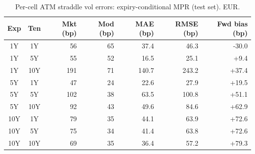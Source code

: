 \begin{table}[H]
\centering
\caption{Per-cell ATM straddle vol errors: expiry-conditional MPR (test set). EUR.}
\label{tab:expiry_mpr_per_cell_test}
\small
\begin{tabular}{@{}ccrrrrr@{}}
\toprule
\textbf{Exp} & \textbf{Ten} & \textbf{Mkt (bp)} & \textbf{Mod (bp)} & \textbf{MAE (bp)} & \textbf{RMSE (bp)} & \textbf{Fwd bias (bp)} \\
\midrule
  1Y & 1Y & 56 & 65 & 37.4 & 46.3 & -30.0 \\
  1Y & 5Y & 55 & 52 & 16.5 & 25.1 & +9.4 \\
  1Y & 10Y & 191 & 71 & 140.7 & 243.2 & +37.4 \\
  \midrule
  5Y & 1Y & 47 & 24 & 22.6 & 27.9 & +19.5 \\
  5Y & 5Y & 102 & 38 & 63.5 & 100.8 & +51.1 \\
  5Y & 10Y & 92 & 43 & 49.6 & 84.6 & +62.9 \\
  \midrule
  10Y & 1Y & 79 & 35 & 44.1 & 63.9 & +72.6 \\
  10Y & 5Y & 75 & 34 & 41.4 & 63.8 & +72.6 \\
  10Y & 10Y & 69 & 35 & 36.4 & 57.2 & +79.3 \\
\bottomrule
\end{tabular}
\end{table}